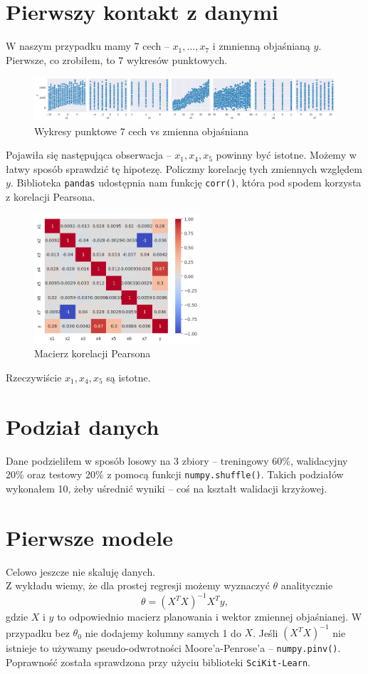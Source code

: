 \documentclass[a4paper,12pt]{article}
\begin{document}
\section{Pierwszy kontakt z danymi}
W naszym przypadku mamy 7 cech -- $x_1, \dots, x_7$ i zmnienną objaśnianą $y$. Pierwsze, co zrobiłem, to 7 wykresów punktowych.
\begin{figure}[h!]
    \centering
    \includegraphics[width=\textwidth]{scatter.png}
    \caption{Wykresy punktowe 7 cech vs zmienna objaśniana}
\end{figure}
Pojawiła się następująca obserwacja -- $x_1, x_4, x_5$ powinny być istotne. Możemy w łatwy sposób sprawdzić tę hipotezę. Policzmy korelację tych zmiennych względem $y$.
Biblioteka \texttt{pandas} udostępnia nam funkcję \texttt{corr()}, która pod spodem korzysta z korelacji Pearsona.
\begin{figure}[h!]
    \centering
    \includegraphics[width=0.55\textwidth]{corr.png}
    \caption{Macierz korelacji Pearsona}
\end{figure}
Rzeczywiście $x_1, x_4, x_5$ są istotne.

\section{Podział danych}
Dane podzieliłem w sposób losowy na 3 zbiory -- treningowy 60\%, walidacyjny 20\% oraz testowy 20\% z pomocą funkcji \texttt{numpy.shuffle()}. Takich podziałów wykonałem 10, żeby uśrednić wyniki -- coś na kształt walidacji krzyżowej.

\section{Pierwsze modele}
Celowo jeszcze nie skaluję danych. \\
Z wykładu wiemy, że dla prostej regresji możemy wyznaczyć $\theta$ analitycznie
\[ \theta = (X^T X)^{-1}X^T y,\]
gdzie $X$ i $y$ to odpowiednio macierz planowania i wektor zmiennej objaśnianej.
W przypadku bez $\theta_0$ nie dodajemy kolumny samych 1 do $X$. Jeśli $(X^T X)^{-1}$ nie istnieje to używamy pseudo-odwrotności Moore'a-Penrose'a -- \texttt{numpy.pinv()}. \\
Poprawność została sprawdzona przy użyciu biblioteki \texttt{SciKit-Learn}.
\end{document}
